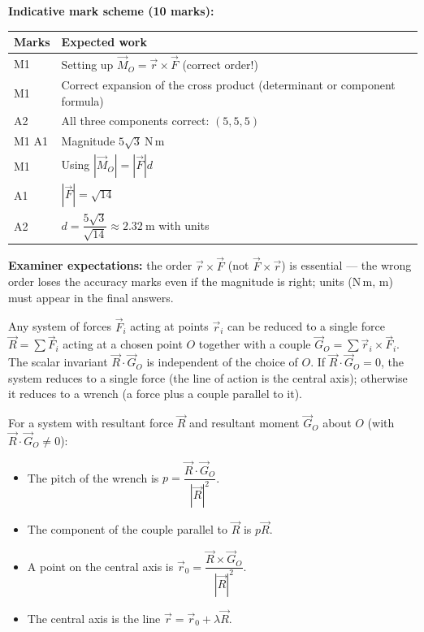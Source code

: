 \documentclass[11pt]{article}
\newcommand{\cle}[1]{{\popxbold\color{popdark}#1}}
\begin{document}
\begin{exoresolu}
\textbf{Indicative mark scheme (10 marks):}
\begin{center}
\begin{tabularx}{\linewidth}{|l|X|}\hline
\rowcolor{popblueL} Marks & Expected work \\ \hline
M1 & Setting up $\vec{M}_O = \vec{r} \times \vec{F}$ (correct order!) \\ \hline
M1 & Correct expansion of the cross product (determinant or component formula) \\ \hline
A2 & All three components correct: $(5, 5, 5)$ \\ \hline
M1 A1 & Magnitude $5\sqrt{3}\ \mathrm{N\,m}$ \\ \hline
M1 & Using $|\vec{M}_O| = |\vec{F}| d$ \\ \hline
A1 & $|\vec{F}| = \sqrt{14}$ \\ \hline
A2 & $d = \dfrac{5\sqrt{3}}{\sqrt{14}} \approx 2.32\ \mathrm{m}$ with units \\ \hline
\end{tabularx}
\end{center}

\textbf{Examiner expectations:} the order $\vec{r} \times \vec{F}$ (not $\vec{F} \times \vec{r}$) is essential — the wrong order loses the accuracy marks even if the magnitude is right; units ($\mathrm{N\,m}$, $\mathrm{m}$) must appear in the final answers.
\end{exoresolu}

\begin{definition}
Any system of forces $\vec{F}_i$ acting at points $\vec{r}_i$ can be reduced to a single force $\vec{R} = \sum \vec{F}_i$ acting at a chosen point $O$ together with a couple $\vec{G}_O = \sum \vec{r}_i \times \vec{F}_i$. The scalar invariant $\vec{R}\cdot\vec{G}_O$ is independent of the choice of $O$. If $\vec{R}\cdot\vec{G}_O = 0$, the system reduces to a single force (the line of action is the \cle{central axis}); otherwise it reduces to a \cle{wrench} (a force plus a couple parallel to it).
\end{definition}

\begin{propriete}
For a system with resultant force $\vec{R}$ and resultant moment $\vec{G}_O$ about $O$ (with $\vec{R}\cdot\vec{G}_O \neq 0$):
\begin{itemize}
\item The \cle{pitch} of the wrench is $p = \dfrac{\vec{R}\cdot\vec{G}_O}{|\vec{R}|^2}$.
\item The component of the couple parallel to $\vec{R}$ is $p\vec{R}$.
\item A point on the central axis is $\vec{r}_0 = \dfrac{\vec{R} \times \vec{G}_O}{|\vec{R}|^2}$.
\item The central axis is the line $\vec{r} = \vec{r}_0 + \lambda \vec{R}$.
\end{itemize}
\end{propriete}
\end{document}
